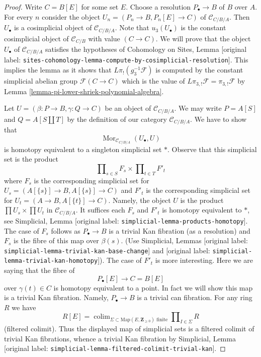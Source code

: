 \documentclass[10pt,a4paper]{article}
\theoremstyle{plain}
\theoremstyle{definition}
\theoremstyle{remark}
\numberwithin{equation}{subsection}
\def\colim{\mathop{\mathrm{colim}}\nolimits}
\def\Mor{\mathop{\mathrm{Mor}}\nolimits}
\begin{document}
\begin{proof}
Write $C = B[E]$ for some set $E$. Choose a resolution
$P_\bullet \to B$ of $B$ over $A$. For every $n$ consider
the object $U_n = (P_n \to B, P_n[E] \to C)$ of $\mathcal{C}_{C/B/A}$.
Then $U_\bullet$ is a cosimplicial object of $\mathcal{C}_{C/B/A}$.
Note that $u_3(U_\bullet)$ is the constant cosimplicial
object of $\mathcal{C}_{C/B}$ with value $(C \to C)$.
We will prove that the object $U_\bullet$ of $\mathcal{C}_{C/B/A}$
satisfies the hypotheses of
Cohomology on Sites, Lemma
\textnormal{[original label: \nolinkurl{sites-cohomology-lemma-compute-by-cosimplicial-resolution}]}.
This implies the lemma as it shows that $L\pi_!(g_3^{-1}\mathcal{F})$
is computed by the constant simplicial abelian group
$\mathcal{F}(C \to C)$ which is the value of
$L\pi_{3, !}\mathcal{F} = \pi_{3, !}\mathcal{F}$ by
Lemma \ref{lemma-pi-lower-shriek-polynomial-algebra}.

\medskip\noindent
Let $U = (\beta : P \to B, \gamma : Q \to C)$ be an object of
$\mathcal{C}_{C/B/A}$. We may write $P = A[S]$ and $Q = A[S \amalg T]$
by the definition of our category $\mathcal{C}_{C/B/A}$. We have to show that
$$
\Mor_{\mathcal{C}_{C/B/A}}(U_\bullet, U)
$$
is homotopy equivalent to a singleton simplicial set $*$. Observe that this
simplicial set is the product
$$
\prod\nolimits_{s \in S} F_s \times \prod\nolimits_{t \in T} F'_t
$$
where $F_s$ is the corresponding simplicial set for
$U_s = (A[\{s\}] \to B, A[\{s\}] \to C)$
and $F'_t$ is the corresponding simplicial set for
$U_t = (A \to B, A[\{t\}] \to C)$. Namely, the object $U$
is the product $\prod U_s \times \prod U_t$ in $\mathcal{C}_{C/B/A}$.
It suffices each $F_s$ and $F'_t$ is homotopy equivalent to $*$, see
Simplicial, Lemma \textnormal{[original label: \nolinkurl{simplicial-lemma-products-homotopy}]}.
The case of $F_s$ follows as $P_\bullet \to B$ is a trivial Kan
fibration (as a resolution) and $F_s$ is the fibre of this map over
$\beta(s)$. (Use Simplicial, Lemmas
\textnormal{[original label: \nolinkurl{simplicial-lemma-trivial-kan-base-change}]} and
\textnormal{[original label: \nolinkurl{simplicial-lemma-trivial-kan-homotopy}]}).
The case of $F'_t$ is more interesting. Here we are saying that
the fibre of
$$
P_\bullet[E] \longrightarrow C = B[E]
$$
over $\gamma(t) \in C$ is homotopy equivalent to a point. In fact we
will show this map is a trivial Kan fibration. Namely,
$P_\bullet \to B$ is a trivial can fibration. For any ring $R$
we have
$$
R[E] =
\colim_{\Sigma \subset \text{Map}(E, \mathbf{Z}_{\geq 0})\text{ finite}}
\prod\nolimits_{I \in \Sigma} R
$$
(filtered colimit). Thus the displayed map of simplicial sets is a
filtered colimit of trivial Kan fibrations, whence a trivial Kan fibration
by Simplicial, Lemma \textnormal{[original label: \nolinkurl{simplicial-lemma-filtered-colimit-trivial-kan}]}.
\end{proof}
\end{document}
